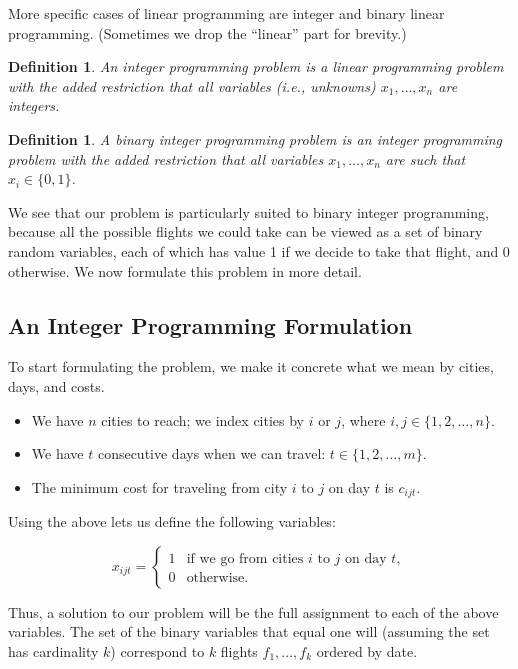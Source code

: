 \documentclass{article}
\newtheorem{defi}[thm]{Definition}
\begin{document}
More specific cases of linear programming are integer and binary linear programming. (Sometimes we drop the ``linear'' part for brevity.)

\begin{defi}\label{defi:integer_programming}
An \emph{integer programming problem} is a linear programming problem with the added restriction that all variables (i.e., unknowns) $x_1, \ldots,
x_n$ are integers.
\end{defi}

\begin{defi}\label{defi:binary_programming}
A \emph{binary integer programming problem} is an integer programming problem with the added restriction that all variables $x_1, \ldots,
x_n$ are such that $x_i \in \{0,1\}$.
\end{defi}

We see that our problem is particularly suited to binary integer programming, because all the possible flights we could take can be viewed as a set of
binary random variables, each of which has value 1 if we decide to take that flight, and 0 otherwise. We now formulate this problem in more detail.

\subsection{An Integer Programming Formulation}\label{sec:int_prog_form}

To start formulating the problem, we make it concrete what we mean by cities, days, and costs.

\begin{itemize}[noitemsep]
    \item We have $n$ cities to reach; we index cities by $i$ or $j$, where $i, j \in \{1, 2, \ldots, n\}$.
    \item We have $t$ consecutive days when we can travel: $t \in \{1, 2, \ldots, m\}$.
    \item The minimum cost for traveling from city $i$ to $j$ on day $t$ is $c_{ijt}$.
\end{itemize}

Using the above lets us define the following variables:

\[
x_{ijt} = \begin{cases}
1 &\mbox{if we go from cities } i \mbox{ to } j \mbox{ on day } t, \\ 
0 & \mbox{otherwise}.
\end{cases}
\]

Thus, a solution to our problem will be the full assignment to each of the above variables. The set of the binary variables that equal one will
(assuming the set has cardinality $k$) correspond to $k$ flights $f_1, \ldots, f_k$ ordered by date.
\end{document}
